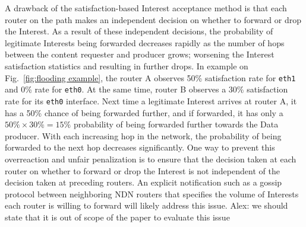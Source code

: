 A drawback of the satisfaction-based Interest acceptance method is that each router on the path makes an independent decision on whether to forward or drop the Interest. 
As a result of these independent decisions,  the probability of legitimate Interests being forwarded decreases rapidly as the number of hops between the content requester and producer grows; worsening the Interest satisfaction statistics and resulting in further drops.
In example on Fig.~\ref{fig:flooding example}, the router A observes 50\% satisfaction rate for \texttt{eth1} and 0\% rate for \texttt{eth0}. 
At the same time, router B observes a 30\% satisfaction rate for its \texttt{eth0} interface.
Next time a legitimate Interest arrives at router A, it has a 50\% chance of being forwarded further, and if forwarded, it has only a $50\% \times 30\% = 15\%$ probability of being forwarded further towards the Data producer. With each increasing hop in the network, the probability of being forwarded to the next hop decreases significantly. 
One way to prevent this overreaction and unfair penalization is to ensure that the decision taken at each router on whether to forward or drop the Interest is not independent of the decision taken at preceding routers. An explicit notification such as a gossip protocol between neighboring NDN routers that specifies the volume of Interests each router is willing to forward will likely address this issue.
{\color{red}Alex: we should state that it is out of scope of the paper to evaluate this issue}

